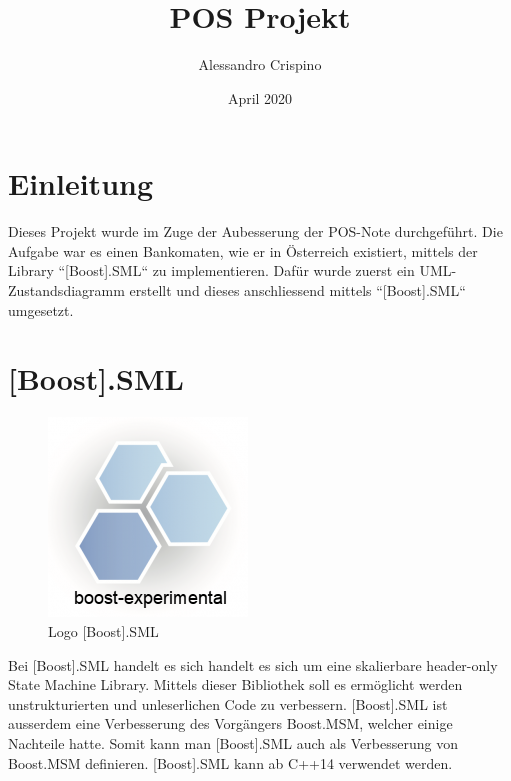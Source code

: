 \documentclass{report}
\title{POS Projekt}
\author{Alessandro Crispino}
\date{April 2020}
\begin{document}
\maketitle
\tableofcontents

%

%
%

\chapter{Einleitung}
Dieses Projekt wurde im Zuge der Aubesserung der POS-Note durchgeführt. Die Aufgabe war es einen Bankomaten, wie er in Österreich existiert, mittels der Library ``[Boost].SML`` zu implementieren. Dafür wurde zuerst ein UML-Zustandsdiagramm erstellt und dieses anschliessend mittels ``[Boost].SML`` umgesetzt.


\chapter{[Boost].SML}
\begin{figure}[h]
  \centering
  \includegraphics[scale=0.5]{images/boost.png}
  \caption[Logo]{Logo [Boost].SML} 
\end{figure}

Bei [Boost].SML handelt es sich handelt es sich um eine skalierbare header-only State Machine Library. Mittels dieser Bibliothek soll es ermöglicht werden unstrukturierten und unleserlichen Code zu verbessern. [Boost].SML ist ausserdem eine Verbesserung des Vorgängers Boost.MSM, welcher einige Nachteile hatte. Somit kann man [Boost].SML auch als Verbesserung von Boost.MSM definieren. [Boost].SML kann ab C++14 verwendet werden.
\end{document}
